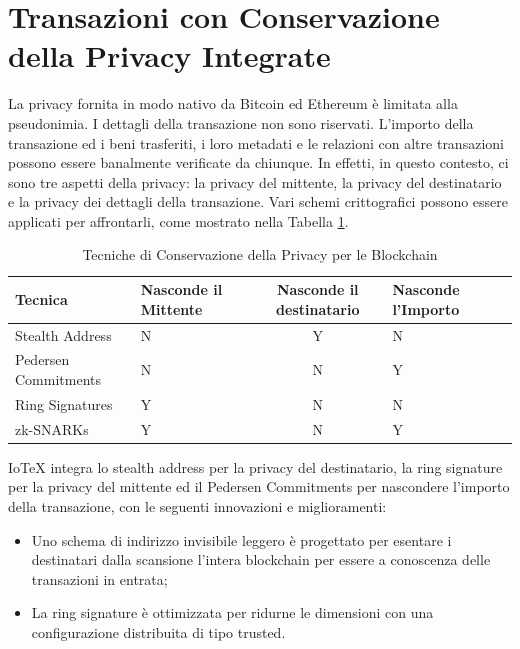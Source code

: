 \section{Transazioni con Conservazione della Privacy Integrate}
La privacy fornita in modo nativo da Bitcoin ed Ethereum è limitata alla pseudonimia. I dettagli della transazione non sono riservati. L'importo della transazione ed i beni trasferiti, i loro metadati e le relazioni con altre transazioni possono essere banalmente verificate da chiunque. In effetti, in questo contesto, ci sono tre aspetti della privacy: la privacy del mittente, la privacy del destinatario e la privacy dei dettagli della transazione. Vari schemi crittografici possono essere applicati per affrontarli, come mostrato nella Tabella \ref{table:PrivacyPreservingTechniques}.

\begin{table}[tp]%
	\caption{Tecniche di Conservazione della Privacy per le Blockchain}
	\label{table:PrivacyPreservingTechniques}\centering %
	\begin{tabular}{l|p{2cm}c|p{2.5cm}|p{2cm}}
		\hline
		Tecnica              & Nasconde il Mittente & Nasconde il destinatario & Nasconde l'Importo \\
		\hline
		Stealth Address      & N                    & Y                        & N                  \\
		Pedersen Commitments & N                    & N                        & Y                  \\
		Ring Signatures      & Y                    & N                        & N                  \\
		zk-SNARKs            & Y                    & N                        & Y                  \\
		\hline
	\end{tabular}
\end{table}

IoTeX integra lo stealth address per la privacy del destinatario, la ring signature per la privacy del mittente ed il Pedersen Commitments per nascondere l'importo della transazione, con le seguenti innovazioni e miglioramenti:

\begin{itemize}
	\item Uno schema di indirizzo invisibile leggero è progettato per esentare i destinatari dalla scansione
	      l'intera blockchain per essere a conoscenza delle transazioni in entrata;

	\item La ring signature è ottimizzata per ridurne le dimensioni con una configurazione distribuita di tipo trusted.
\end{itemize}


